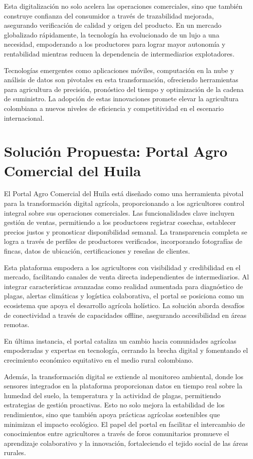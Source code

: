 Esta digitalización no solo acelera las operaciones comerciales, sino que también construye confianza del consumidor a través de trazabilidad mejorada, asegurando verificación de calidad y origen del producto. En un mercado globalizado rápidamente, la tecnología ha evolucionado de un lujo a una necesidad, empoderando a los productores para lograr mayor autonomía y rentabilidad mientras reducen la dependencia de intermediarios explotadores.

Tecnologías emergentes como aplicaciones móviles, computación en la nube y análisis de datos son pivotales en esta transformación, ofreciendo herramientas para agricultura de precisión, pronóstico del tiempo y optimización de la cadena de suministro. La adopción de estas innovaciones promete elevar la agricultura colombiana a nuevos niveles de eficiencia y competitividad en el escenario internacional.

\section{Solución Propuesta: Portal Agro Comercial del Huila}

El Portal Agro Comercial del Huila está diseñado como una herramienta pivotal para la transformación digital agrícola, proporcionando a los agricultores control integral sobre sus operaciones comerciales. Las funcionalidades clave incluyen gestión de ventas, permitiendo a los productores registrar cosechas, establecer precios justos y pronosticar disponibilidad semanal. La transparencia completa se logra a través de perfiles de productores verificados, incorporando fotografías de fincas, datos de ubicación, certificaciones y reseñas de clientes.

Esta plataforma empodera a los agricultores con visibilidad y credibilidad en el mercado, facilitando canales de venta directa independientes de intermediarios. Al integrar características avanzadas como realidad aumentada para diagnóstico de plagas, alertas climáticas y logística colaborativa, el portal se posiciona como un ecosistema que apoya el desarrollo agrícola holístico. La solución aborda desafíos de conectividad a través de capacidades offline, asegurando accesibilidad en áreas remotas.

En última instancia, el portal cataliza un cambio hacia comunidades agrícolas empoderadas y expertas en tecnología, cerrando la brecha digital y fomentando el crecimiento económico equitativo en el medio rural colombiano.

Además, la transformación digital se extiende al monitoreo ambiental, donde los sensores integrados en la plataforma proporcionan datos en tiempo real sobre la humedad del suelo, la temperatura y la actividad de plagas, permitiendo estrategias de gestión proactivas. Esto no solo mejora la estabilidad de los rendimientos, sino que también apoya prácticas agrícolas sostenibles que minimizan el impacto ecológico. El papel del portal en facilitar el intercambio de conocimientos entre agricultores a través de foros comunitarios promueve el aprendizaje colaborativo y la innovación, fortaleciendo el tejido social de las áreas rurales.

